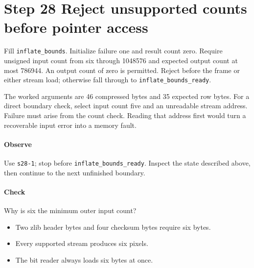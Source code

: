 \section{Step 28 Reject unsupported counts before pointer access}\label{png-inflate-s28}
Fill \texttt{inflate\_bounds}. Initialize failure one and result count zero. Require unsigned input count from six through 1048576 and expected output count at most 786944. An output count of zero is permitted. Reject before the frame or either stream load; otherwise fall through to \texttt{inflate\_bounds\_ready}.

The worked arguments are 46 compressed bytes and 35 expected row bytes. For a direct boundary check, select input count five and an unreadable stream address. Failure must arise from the count check. Reading that address first would turn a recoverable input error into a memory fault.

\paragraph{Observe} Use \texttt{s28-1}; stop before \texttt{inflate\_bounds\_ready}. Inspect the state described above, then continue to the next unfinished boundary.

\paragraph{Check} Why is six the minimum outer input count?
\begin{itemize}
  \item[A.] Two zlib header bytes and four checksum bytes require six bytes.
  \item[B.] Every supported stream produces six pixels.
  \item[C.] The bit reader always loads six bytes at once.
\end{itemize}
